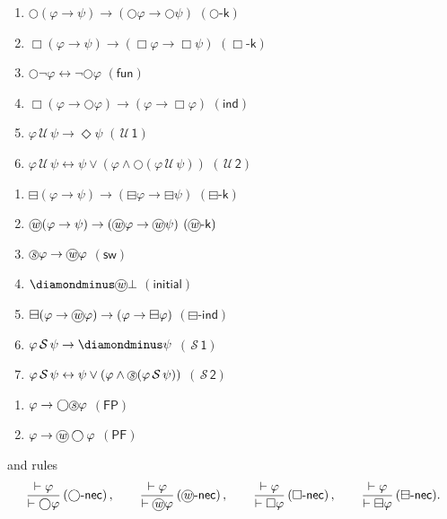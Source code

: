 \documentclass[envcountsect,envcountsame,oribibl,orivec]{llncs}
\newcommand*\circled[1]{\tikz[baseline=(char.base)]{
		\node[shape=circle,draw,inner sep=0.4pt] (char) {#1};}}
\newcommand{\lneg}{\neg}
\newcommand{\lrule}[2]{\displaystyle{\frac{#1}{#2}}}
\newcommand{\limplies}{\rightarrow}
\newcommand{\liff}{\leftrightarrow}
\newcommand{\lnext}{\bigcirc}
\newcommand{\lalways}{\Box}
\newcommand{\leventually}{\Diamond}
\newcommand{\lonce}{\diamondminus}
\newcommand{\lsofar}{\boxminus}
\newcommand{\luntil}{{\,\mathcal{U}\,}}
\newcommand{\lsince}{{\,\mathcal{S}\,}}
\newcommand{\wprevious}{\circled{\textit{w}}}
\newcommand{\sprevious}{\circled{\textit{s}}}
\newcommand{\kax}{\ensuremath{\textsf{-k}}}
\newcommand{\nextkax}{\ensuremath{(\lnext\kax)}}
\newcommand{\alwayskax}{\ensuremath{(\lalways\kax)}}
\newcommand{\funax}{\ensuremath{(\textsf{fun})}}
\newcommand{\indax}{\ensuremath{(\textsf{ind})}}
\newcommand{\uoneax}{\ensuremath{(\luntil\textsf{1})}}
\newcommand{\utwoax}{\ensuremath{(\luntil\textsf{2})}}
\newcommand{\necrule}{\ensuremath{\textsf{-nec}}}
\newcommand{\nextnecrule}{\ensuremath{(\lnext\necrule)}}
\newcommand{\alwaysnecrule}{\ensuremath{(\lalways\necrule)}}
\newcommand{\prevnecrule}{\ensuremath{(\wprevious\necrule)}}
\newcommand{\sofarnecrule}{\ensuremath{(\lsofar\necrule)}}
\newcommand{\prevkax}{\ensuremath{(\wprevious\kax)}}
\newcommand{\sofarkax}{\ensuremath{(\lsofar\kax)}}
\newcommand{\swprevax}{\ensuremath{(\textsf{sw})}}
\newcommand{\fpax}{\ensuremath{(\textsf{FP})}}
\newcommand{\pfax}{\ensuremath{(\textsf{PF})}}
\newcommand{\initialax}{\ensuremath{(\textsf{initial})}}
\newcommand{\sofarindax}{\ensuremath{(\lsofar\textsf{-ind})}}
\newcommand{\soneax}{\ensuremath{(\lsince\textsf{1})}}
\newcommand{\stwoax}{\ensuremath{(\lsince\textsf{2})}}
\newcounter{enumsave}
\renewcommand{\phi}{\varphi}
\begin{document}
 \begin{enumerate}
  \setcounter{enumi}{\theenumsave}
  \item $\lnext( \phi \limplies \psi) \limplies (\lnext \phi \limplies \lnext \psi)$ \hfill \nextkax
  \item $\lalways( \phi \limplies \psi) \limplies (\lalways \phi \limplies \lalways \psi)$ \hfill \alwayskax
  \item $\lnext \lneg \phi \liff \lneg \lnext \phi$ \hfill \funax
  \item $\lalways (\phi \limplies \lnext \phi) \limplies (\phi \limplies \lalways \phi)$ \hfill \indax
  \item $\phi \luntil \psi \limplies \leventually \psi$ \hfill \uoneax
  \item $\phi \luntil \psi \liff \psi \lor (\phi \land \lnext(\phi \luntil \psi))$ \hfill \utwoax
  \setcounter{enumsave}{\theenumi}
\end{enumerate}
%
%
  \begin{enumerate}
  	\setcounter{enumi}{\theenumsave}
  \item $\lsofar( \phi \limplies \psi) \limplies (\lsofar \phi \limplies \lsofar \psi)$ \hfill \sofarkax
  \item $\wprevious( \phi \limplies \psi) \limplies (\wprevious \phi \limplies \wprevious \psi)$ \hfill \prevkax
  \item $\sprevious \phi \rightarrow \wprevious\phi$ \hfill \swprevax
  \item $\lonce \wprevious \bot$ \hfill \initialax
    \item $\lsofar (\phi \limplies \wprevious \phi) \limplies (\phi \limplies \lsofar \phi)$ \hfill \sofarindax
  \item $\phi \lsince \psi \rightarrow \lonce \psi$ \hfill \soneax
  \item $\phi \lsince \psi \liff \psi \lor (\phi \land \sprevious(\phi \lsince \psi))$ \hfill \stwoax
  \setcounter{enumsave}{\theenumi}
 \end{enumerate}
%
%
\begin{enumerate}
	\setcounter{enumi}{\theenumsave}

	\item $\phi \rightarrow \lnext \sprevious \phi$ \hfill \fpax
	\item $\phi \rightarrow \wprevious \lnext \phi$ \hfill \pfax

	\setcounter{enumsave}{\theenumi}
\end{enumerate}
 and rules
 \[
  \lrule{\vdash \phi}{\vdash \lnext \phi}\,\nextnecrule \, , \qquad\lrule{\vdash \phi}{\vdash \wprevious \phi}\, \prevnecrule \, , \qquad \lrule{\vdash \phi}{\vdash \lalways\phi}\,\alwaysnecrule \, ,\qquad \lrule{\vdash \phi}{\vdash \lsofar\phi}\,\sofarnecrule.
 \]
\end{document}
